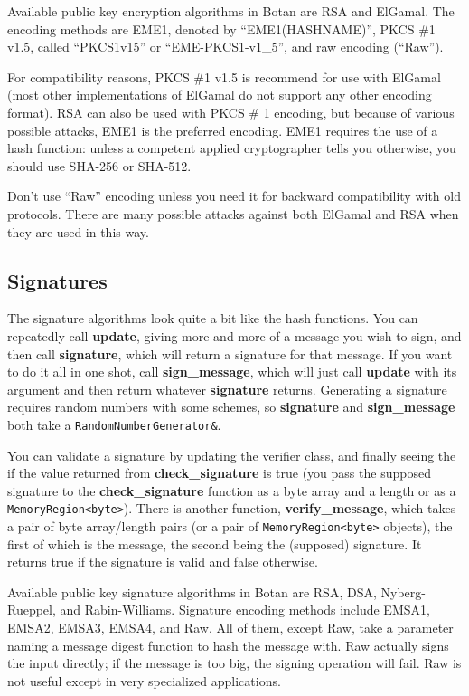 \documentclass{article}
\newcommand{\function}[1]{\textbf{#1}}
\newcommand{\type}[1]{\texttt{#1}}
\begin{document}
Available public key encryption algorithms in Botan are RSA and ElGamal. The
encoding methods are EME1, denoted by ``EME1(HASHNAME)'', PKCS \#1 v1.5,
called ``PKCS1v15'' or ``EME-PKCS1-v1\_5'', and raw encoding (``Raw'').

For compatibility reasons, PKCS \#1 v1.5 is recommend for use with
ElGamal (most other implementations of ElGamal do not support any
other encoding format). RSA can also be used with PKCS \# 1 encoding,
but because of various possible attacks, EME1 is the preferred
encoding. EME1 requires the use of a hash function: unless a competent
applied cryptographer tells you otherwise, you should use SHA-256 or
SHA-512.

Don't use ``Raw'' encoding unless you need it for backward
compatibility with old protocols. There are many possible attacks
against both ElGamal and RSA when they are used in this way.

\subsection{Signatures}

The signature algorithms look quite a bit like the hash functions. You
can repeatedly call \function{update}, giving more and more of a
message you wish to sign, and then call \function{signature}, which
will return a signature for that message. If you want to do it all in
one shot, call \function{sign\_message}, which will just call
\function{update} with its argument and then return whatever
\function{signature} returns. Generating a signature requires random
numbers with some schemes, so \function{signature} and
\function{sign\_message} both take a \type{RandomNumberGenerator\&}.

You can validate a signature by updating the verifier class, and finally seeing
the if the value returned from \function{check\_signature} is true (you pass
the supposed signature to the \function{check\_signature} function as a byte
array and a length or as a \type{MemoryRegion<byte>}). There is another
function, \function{verify\_message}, which takes a pair of byte array/length
pairs (or a pair of \type{MemoryRegion<byte>} objects), the first of which is
the message, the second being the (supposed) signature. It returns true if the
signature is valid and false otherwise.

Available public key signature algorithms in Botan are RSA, DSA,
Nyberg-Rueppel, and Rabin-Williams. Signature encoding methods include EMSA1,
EMSA2, EMSA3, EMSA4, and Raw. All of them, except Raw, take a parameter naming
a message digest function to hash the message with. Raw actually signs the
input directly; if the message is too big, the signing operation will fail. Raw
is not useful except in very specialized applications.
\end{document}
